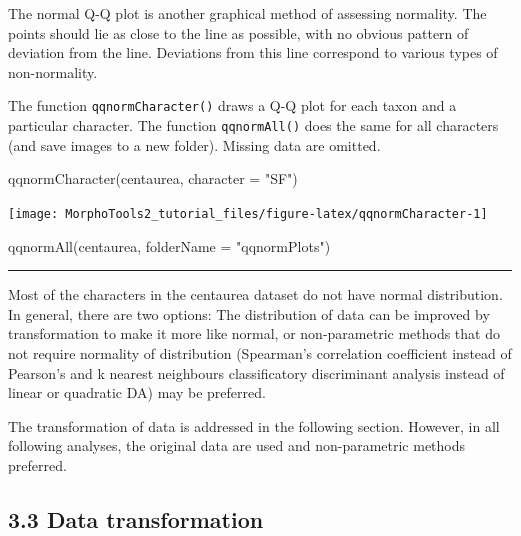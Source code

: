 \documentclass[
  11pt,
  a4paper]{article}
\newenvironment{Shaded}{\begin{snugshade}}{\end{snugshade}}
\newcommand{\AttributeTok}[1]{\textcolor[rgb]{0.77,0.63,0.00}{#1}}
\newcommand{\FunctionTok}[1]{\textcolor[rgb]{0.00,0.00,0.00}{#1}}
\newcommand{\NormalTok}[1]{#1}
\newcommand{\StringTok}[1]{\textcolor[rgb]{0.31,0.60,0.02}{#1}}
\begin{document}
The normal Q-Q plot is another graphical method of assessing normality.
The points should lie as close to the line as possible, with no obvious
pattern of deviation from the line. Deviations from this line correspond
to various types of non-normality.

The function \texttt{qqnormCharacter()} draws a Q-Q plot for each taxon
and a particular character. The function \texttt{qqnormAll()} does the
same for all characters (and save images to a new folder). Missing data
are omitted.

\newpage

\begin{Shaded}
\begin{Highlighting}[]
\FunctionTok{qqnormCharacter}\NormalTok{(centaurea, }\AttributeTok{character =} \StringTok{"SF"}\NormalTok{)}
\end{Highlighting}
\end{Shaded}

\begin{center}\texttt{[image: MorphoTools2\_tutorial\_files/figure-latex/qqnormCharacter-1]} \end{center}

\begin{Shaded}
\begin{Highlighting}[]
\FunctionTok{qqnormAll}\NormalTok{(centaurea, }\AttributeTok{folderName =} \StringTok{"qqnormPlots"}\NormalTok{)}
\end{Highlighting}
\end{Shaded}

\begin{center}\rule{0.5\linewidth}{0.5pt}\end{center}

Most of the characters in the centaurea dataset do not have normal
distribution. In general, there are two options: The distribution of
data can be improved by transformation to make it more like normal, or
non-parametric methods that do not require normality of distribution
(Spearman's correlation coefficient instead of Pearson's and k nearest
neighbours classificatory discriminant analysis instead of linear or
quadratic DA) may be preferred.

The transformation of data is addressed in the following section.
However, in all following analyses, the original data are used and
non-parametric methods preferred.

\hypertarget{data-transformation}{%
\subsection{3.3 Data transformation}\label{data-transformation}}
\end{document}
